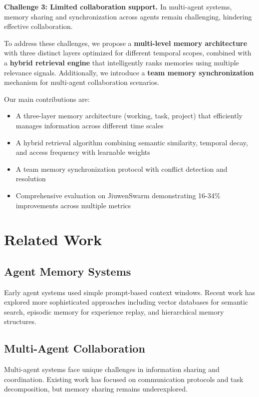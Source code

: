 \documentclass{article}
\begin{document}
\textbf{Challenge 3: Limited collaboration support.} In multi-agent systems,
memory sharing and synchronization across agents remain challenging, hindering
effective collaboration.

To address these challenges, we propose a \textbf{multi-level memory architecture}
with three distinct layers optimized for different temporal scopes, combined with
a \textbf{hybrid retrieval engine} that intelligently ranks memories using multiple
relevance signals. Additionally, we introduce a \textbf{team memory synchronization}
mechanism for multi-agent collaboration scenarios.

Our main contributions are:

\begin{itemize}
\item A three-layer memory architecture (working, task, project) that efficiently
manages information across different time scales
\item A hybrid retrieval algorithm combining semantic similarity, temporal decay,
and access frequency with learnable weights
\item A team memory synchronization protocol with conflict detection and resolution
\item Comprehensive evaluation on JiuwenSwarm demonstrating 16-34\% improvements
across multiple metrics
\end{itemize}

\section{Related Work}

\subsection{Agent Memory Systems}

Early agent systems used simple prompt-based context windows. Recent work has
explored more sophisticated approaches including vector databases for semantic
search, episodic memory for experience replay, and hierarchical memory structures.

\subsection{Multi-Agent Collaboration}

Multi-agent systems face unique challenges in information sharing and coordination.
Existing work has focused on communication protocols and task decomposition, but
memory sharing remains underexplored.
\end{document}
